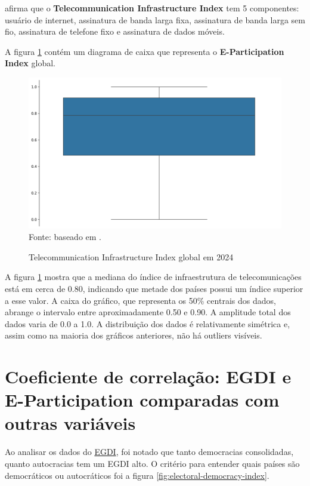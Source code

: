 \cite{ONU_EGDI_methodology} afirma que o \textbf{Telecommunication Infrastructure Index} tem 5 componentes: usuário de internet, assinatura de banda larga fixa, assinatura de banda larga sem fio, assinatura de telefone fixo e assinatura de dados móveis.

A figura \ref{fig:boxplot_tci_global} contém um diagrama de caixa que representa o \textbf{E-Participation Index} global.

\begin{figure}[H]
	\centering
	\caption{Telecommunication Infrastructure Index global em 2024}
	\includegraphics[width=1\linewidth]{figuras/egdi/boxplot_tci_global.png}
	\label{fig:boxplot_tci_global}
	\footnotesize{Fonte: baseado em \cite{ONU_EGDI_mapa}.}
\end{figure}

A figura \ref{fig:boxplot_tci_global} mostra que a mediana do índice de infraestrutura de telecomunicações está em cerca de 0.80, indicando que metade dos países possui um índice superior a esse valor. A caixa do gráfico, que representa os 50\% centrais dos dados, abrange o intervalo entre aproximadamente 0.50 e 0.90. A amplitude total dos dados varia de 0.0 a 1.0. A distribuição dos dados é relativamente simétrica e, assim como na maioria dos gráficos anteriores, não há outliers visíveis.

\section{Coeficiente de correlação: EGDI e E-Participation comparadas com outras variáveis}

Ao analisar os dados do \href{https://publicadministration.un.org/egovkb/en-us/About/Overview/-E-Government-Development-Index}{EGDI}, foi notado que tanto democracias consolidadas, quanto autocracias tem um EGDI alto. O critério para entender quais países são democráticos ou autocráticos foi a figura \ref{fig:electoral-democracy-index}. 

